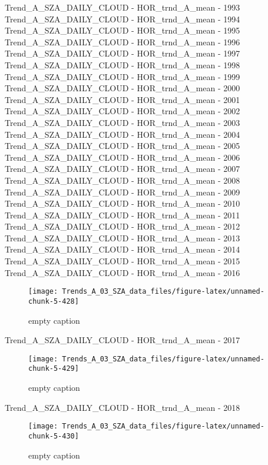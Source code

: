 \documentclass[
  10pt,
  a4paper,oneside]{article}
\begin{document}
Trend\_A\_SZA\_DAILY\_CLOUD - HOR\_trnd\_A\_mean - 1993
Trend\_A\_SZA\_DAILY\_CLOUD - HOR\_trnd\_A\_mean - 1994
Trend\_A\_SZA\_DAILY\_CLOUD - HOR\_trnd\_A\_mean - 1995
Trend\_A\_SZA\_DAILY\_CLOUD - HOR\_trnd\_A\_mean - 1996
Trend\_A\_SZA\_DAILY\_CLOUD - HOR\_trnd\_A\_mean - 1997
Trend\_A\_SZA\_DAILY\_CLOUD - HOR\_trnd\_A\_mean - 1998
Trend\_A\_SZA\_DAILY\_CLOUD - HOR\_trnd\_A\_mean - 1999
Trend\_A\_SZA\_DAILY\_CLOUD - HOR\_trnd\_A\_mean - 2000
Trend\_A\_SZA\_DAILY\_CLOUD - HOR\_trnd\_A\_mean - 2001
Trend\_A\_SZA\_DAILY\_CLOUD - HOR\_trnd\_A\_mean - 2002
Trend\_A\_SZA\_DAILY\_CLOUD - HOR\_trnd\_A\_mean - 2003
Trend\_A\_SZA\_DAILY\_CLOUD - HOR\_trnd\_A\_mean - 2004
Trend\_A\_SZA\_DAILY\_CLOUD - HOR\_trnd\_A\_mean - 2005
Trend\_A\_SZA\_DAILY\_CLOUD - HOR\_trnd\_A\_mean - 2006
Trend\_A\_SZA\_DAILY\_CLOUD - HOR\_trnd\_A\_mean - 2007
Trend\_A\_SZA\_DAILY\_CLOUD - HOR\_trnd\_A\_mean - 2008
Trend\_A\_SZA\_DAILY\_CLOUD - HOR\_trnd\_A\_mean - 2009
Trend\_A\_SZA\_DAILY\_CLOUD - HOR\_trnd\_A\_mean - 2010
Trend\_A\_SZA\_DAILY\_CLOUD - HOR\_trnd\_A\_mean - 2011
Trend\_A\_SZA\_DAILY\_CLOUD - HOR\_trnd\_A\_mean - 2012
Trend\_A\_SZA\_DAILY\_CLOUD - HOR\_trnd\_A\_mean - 2013
Trend\_A\_SZA\_DAILY\_CLOUD - HOR\_trnd\_A\_mean - 2014
Trend\_A\_SZA\_DAILY\_CLOUD - HOR\_trnd\_A\_mean - 2015
Trend\_A\_SZA\_DAILY\_CLOUD - HOR\_trnd\_A\_mean - 2016

\begin{figure}[!ht]

{\centering \texttt{[image: Trends\_A\_03\_SZA\_data\_files/figure-latex/unnamed-chunk-5-428]} 

}

\caption{ empty caption }\label{fig:unnamed-chunk-5-428}
\end{figure}

Trend\_A\_SZA\_DAILY\_CLOUD - HOR\_trnd\_A\_mean - 2017

\begin{figure}[!ht]

{\centering \texttt{[image: Trends\_A\_03\_SZA\_data\_files/figure-latex/unnamed-chunk-5-429]} 

}

\caption{ empty caption }\label{fig:unnamed-chunk-5-429}
\end{figure}

Trend\_A\_SZA\_DAILY\_CLOUD - HOR\_trnd\_A\_mean - 2018

\begin{figure}[!ht]

{\centering \texttt{[image: Trends\_A\_03\_SZA\_data\_files/figure-latex/unnamed-chunk-5-430]} 

}

\caption{ empty caption }\label{fig:unnamed-chunk-5-430}
\end{figure}
\end{document}
